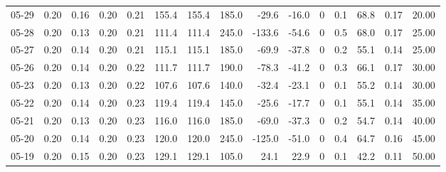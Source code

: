 \begin{threeparttable}
{\begin{tabular}{lrrrrrrrrrrrrrr}
  05-29 &          0.20 &          0.16 &          0.20 &        0.21 &               155.4 &              155.4 &               185.0 &      -29.6 &        -16.0 &              0 &                 0.1 &             68.8 &            0.17 &                  20.00 \\
  05-28 &          0.20 &          0.13 &          0.20 &        0.21 &               111.4 &              111.4 &               245.0 &     -133.6 &        -54.6 &              0 &                 0.5 &             68.0 &            0.17 &                  25.00 \\
  05-27 &          0.20 &          0.14 &          0.20 &        0.21 &               115.1 &              115.1 &               185.0 &      -69.9 &        -37.8 &              0 &                 0.2 &             55.1 &            0.14 &                  25.00 \\
  05-26 &          0.20 &          0.14 &          0.20 &        0.22 &               111.7 &              111.7 &               190.0 &      -78.3 &        -41.2 &              0 &                 0.3 &             66.1 &            0.17 &                  30.00 \\
  05-23 &          0.20 &          0.13 &          0.20 &        0.22 &               107.6 &              107.6 &               140.0 &      -32.4 &        -23.1 &              0 &                 0.1 &             55.2 &            0.14 &                  30.00 \\
  05-22 &          0.20 &          0.14 &          0.20 &        0.23 &               119.4 &              119.4 &               145.0 &      -25.6 &        -17.7 &              0 &                 0.1 &             55.1 &            0.14 &                  35.00 \\
  05-21 &          0.20 &          0.13 &          0.20 &        0.23 &               116.0 &              116.0 &               185.0 &      -69.0 &        -37.3 &              0 &                 0.2 &             54.7 &            0.14 &                  40.00 \\
  05-20 &          0.20 &          0.14 &          0.20 &        0.23 &               120.0 &              120.0 &               245.0 &     -125.0 &        -51.0 &              0 &                 0.4 &             64.7 &            0.16 &                  45.00 \\
  05-19 &          0.20 &          0.15 &          0.20 &        0.23 &               129.1 &              129.1 &               105.0 &       24.1 &         22.9 &              0 &                 0.1 &             42.2 &            0.11 &                  50.00 \\

\end{tabular}}
\end{threeparttable}
